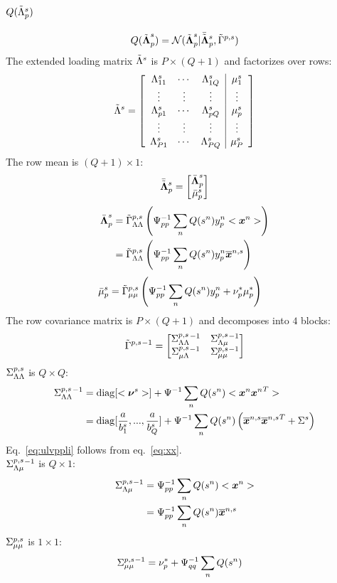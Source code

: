 \documentclass[a4paper]{article}
\begin{document}
\subsection{$Q(\tilde{\Lambda}^s_p)$}
\begin{align}
  Q(\tilde{\boldsymbol{\Lambda}}^s_p)=\mathcal{N}(\tilde{\boldsymbol{\Lambda}}^s_p|\bar{\tilde{\boldsymbol{\Lambda}}}^s_p,\tilde{\Gamma}^{p,s})
\end{align}
The extended loading matrix $\tilde{\Lambda}^s$ is $P\times (Q+1)$ and factorizes over rows:
\begin{align}
  \tilde{\Lambda}^s=\left[
    \begin{array}{ccc|c}
      \Lambda^s_{11} & \cdots & \Lambda^s_{1Q} & \mu^s_1 \\
      \vdots & \vdots & \vdots & \vdots \\
      \Lambda^s_{p1} & \cdots & \Lambda^s_{pQ} & \mu^s_p \\
      \vdots & \vdots & \vdots & \vdots \\
      \Lambda^s_{P1} & \cdots & \Lambda^s_{PQ} & \mu^s_P
    \end{array}
  \right]
\end{align}
The row mean is $(Q+1)\times 1$:
\begin{align}
  \bar{\tilde{\boldsymbol{\Lambda}}}^s_p=\begin{bmatrix}
    \bar{\boldsymbol{\Lambda}}^s_p \\
    \bar{\mu}^s_p
  \end{bmatrix}
\end{align}
\begin{align}
  \bar{\boldsymbol{\Lambda}}^s_p
  &=\tilde{\Gamma}^{p,s}_{\Lambda\Lambda}\left(\Psi^{-1}_{pp}\sum_n Q(s^n)y^n_p<\boldsymbol{x}^n>\right) \\
  &=\tilde{\Gamma}^{p,s}_{\Lambda\Lambda}\left(\Psi^{-1}_{pp}\sum_n Q(s^n)y^n_p\overline{\boldsymbol{x}}^{n,s}\right)
\end{align}
\begin{align}
  \bar{\mu}^s_p
  &=\tilde{\Gamma}^{p,s}_{\mu\mu}\left(\Psi^{-1}_{pp}\sum_n Q(s^n)y^n_p+\nu^*_p\mu^*_p\right)
\end{align}
The row covariance matrix is $P\times(Q+1)$ and decomposes into $4$ blocks:
\begin{align}
  \tilde{\Gamma}^{p,s}{}^{-1}=\begin{bmatrix}
    \Sigma^{p,s}_{\Lambda\Lambda}{}^{-1} & \Sigma^{p,s}_{\Lambda\mu}{}^{-1} \\
    \Sigma^{p,s}_{\mu\Lambda}{}^{-1} & \Sigma^{p,s}_{\mu\mu}{}^{-1}
  \end{bmatrix}
\end{align}
$\Sigma^{p,s}_{\Lambda\Lambda}$ is $Q\times Q$:
\begin{align}
  \Sigma^{p,s}_{\Lambda\Lambda}{}^{-1}
  &=\operatorname{diag}[<\boldsymbol{\nu}^s>]+\Psi^{-1}\sum_n Q(s^n)<\boldsymbol{x}^n{\boldsymbol{x}^n}^T> \\
  &=\operatorname{diag}[\frac{a}{b^s_1},...,\frac{a}{b^s_Q}]+\Psi^{-1}\sum_n Q(s^n)\left(\overline{\boldsymbol{x}}^{n,s}{\overline{\boldsymbol{x}}^{n,s}}^T+\Sigma^s\right) \label{eq:ulvppli}
\end{align}
Eq.~\ref{eq:ulvppli} follows from eq.~\ref{eq:xx}. \\
$\Sigma^{p,s}_{\Lambda\mu}{}^{-1}$ is $Q\times 1$:
\begin{align}
  \Sigma^{p,s}_{\Lambda\mu}{}^{-1}
  &=\Psi^{-1}_{pp}\sum_n Q(s^n)<\boldsymbol{x}^n> \\
  &=\Psi^{-1}_{pp}\sum_n Q(s^n)\overline{\boldsymbol{x}}^{n,s}
\end{align}
$\Sigma^{p,s}_{\mu\mu}$ is $1\times 1$:
\begin{align}
  \Sigma^{p,s}_{\mu\mu}{}^{-1}&=
  \nu^*_p+\Psi^{-1}_{qq}\sum_n Q(s^n)
\end{align}
\end{document}

